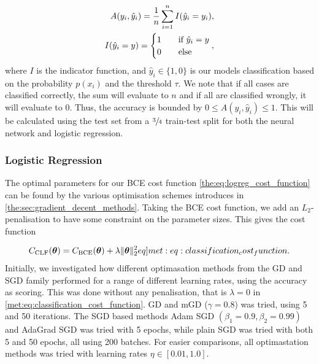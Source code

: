     \begin{align}
        A(y_i, \hat{y}_i) = \frac{1}{n}\sum_{i=1}^{n} I(\hat{y}_i = y_i), \\
        I(\hat{y}_i = y) = \begin{cases}
            1\hspace{10px}&\text{if }\hat{y}_i = y \\
            0\hspace{10px}&\text{else}
        \end{cases} \nonumber,
    \end{align}
    where $I$ is the indicator function, and $\hat{y}_i \in \{ 1, 0\}$ is our models classification based on the probability $p(x_i)$ and the threshold $\tau$. We note that if all cases are classified correctly, the sum will evaluate to $n$ and if all are classified wrongly, it will evaluate to 0. Thus, the accuracy is bounded by $0 \leq A(y_i, \hat{y}_i) \leq 1$. This will be calculated using the test set from a $\sfrac{3}{4}$ train-test split for both the neural network and logistic regression.

    \subsubsection{Logistic Regression}
    The optimal parameters for our BCE cost function \cref{the:eq:logreg_cost_function} can be found by the various optimisation schemes introduces in \cref{the:sec:gradient_decent_methods}. Taking the BCE cost function, we add an $L_2$-penalisation to have some constraint on the parameter sizes. This gives the cost function

    \begin{align}
        \msub{C}{CLF}(\vec{\theta}) = \msub{C}{BCE}(\vec{\theta}) +  \lambda\norm[2]{\vec{\theta}}^2
        \label[eq]{met:eq:classification_cost_function}.
    \end{align}
    Initially, we investigated how different optimasation methods from the GD and SGD family performed for a range of different learning rates, using the accuracy as scoring. This was done without any penalisation, that is $\lambda = 0$ in \cref{met:eq:classification_cost_function}. GD and mGD ($\gamma = 0.8$) was tried, using 5 and 50 iterations. The SGD based methods Adam SGD $(\beta_1 = 0.9, \beta_2 = 0.99)$ and AdaGrad SGD was tried with 5 epochs, while plain SGD was tried with both 5 and 50 epochs, all using  200 batches. For easier comparisons, all optimastation methods was tried with learning rates  $\eta \in [0.01, 1.0]$.     
    
